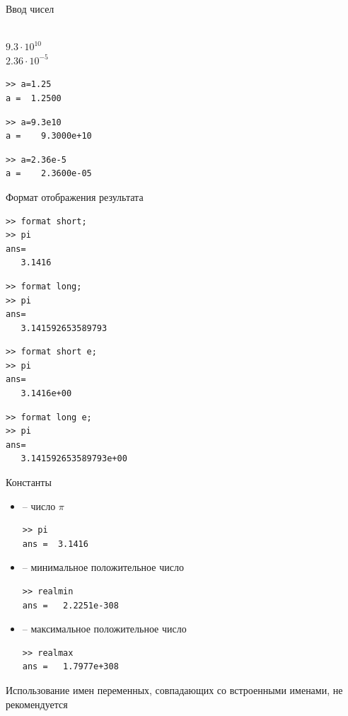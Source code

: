 \documentclass[11pt, compress]{beamer}
\begin{document}
\begin{frame}[fragile]{Ввод чисел}
\begin{tabbing}
      \hspace{75pt} \=  \\
     \> $9.3 \cdot 10^{10}$\\
     \> $2.36 \cdot 10^{-5}$ 
\end{tabbing} 
\begin{lstlisting}    
>> a=1.25
a =  1.2500  
\end{lstlisting}    
\begin{lstlisting}    
>> a=9.3e10
a =    9.3000e+10
\end{lstlisting}    
\begin{lstlisting}    
>> a=2.36e-5
a =    2.3600e-05
\end{lstlisting}    
\end{frame}

\begin{frame}[fragile]{Формат отображения результата}
\begin{lstlisting}
>> format short;
>> pi 
ans=
   3.1416
\end{lstlisting}   
\begin{lstlisting}
>> format long;
>> pi 
ans=
   3.141592653589793
\end{lstlisting}   
\begin{lstlisting}
>> format short e;
>> pi 
ans=
   3.1416e+00
\end{lstlisting}   
\begin{lstlisting}
>> format long e;   
>> pi 
ans=
   3.141592653589793e+00   
\end{lstlisting}   
\end{frame}


\begin{frame}[fragile]{Константы}
  \begin{itemize}
    \item {} -- число $\pi$ 
\begin{lstlisting}
>> pi
ans =  3.1416  
\end{lstlisting}
    \item {} -- минимальное положительное число 
\begin{lstlisting}
>> realmin
ans =   2.2251e-308
\end{lstlisting}
    \item {} -- максимальное положительное число
\begin{lstlisting}
>> realmax
ans =   1.7977e+308
\end{lstlisting}    
  \end{itemize}
\alert{Использование имен переменных, совпадающих со встроенными именами, не рекомендуется}
\end{frame}
\end{document}
